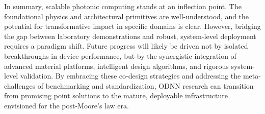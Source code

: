 \documentclass[11pt]{article}
\begin{document}
In summary, scalable photonic computing stands at an inflection point. The foundational physics and architectural primitives are well-understood, and the potential for transformative impact in specific domains is clear. However, bridging the gap between laboratory demonstrations and robust, system-level deployment requires a paradigm shift. Future progress will likely be driven not by isolated breakthroughs in device performance, but by the synergistic integration of advanced material platforms, intelligent design algorithms, and rigorous system-level validation. By embracing these co-design strategies and addressing the meta-challenges of benchmarking and standardization, ODNN research can transition from promising point solutions to the mature, deployable infrastructure envisioned for the post-Moore's law era.



\end{document}
